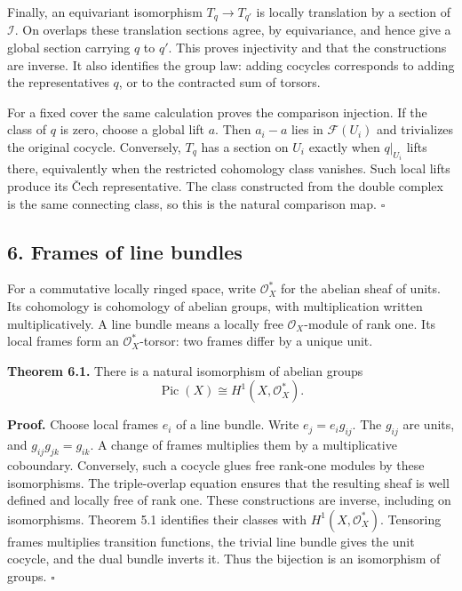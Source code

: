 \documentclass[11pt]{article}
\begin{document}
Finally, an equivariant isomorphism \(T_q\to T_{q'}\) is locally
translation by a section of \(\mathcal I\). On overlaps these
translation sections agree, by equivariance, and hence give a global
section carrying \(q\) to \(q'\). This proves injectivity and that the
constructions are inverse. It also identifies the group law: adding
cocycles corresponds to adding the representatives \(q\), or to the
contracted sum of torsors.

For a fixed cover the same calculation proves the comparison injection.
If the class of \(q\) is zero, choose a global lift \(a\). Then
\(a_i-a\) lies in \(\mathcal F(U_i)\) and trivializes the original
cocycle. Conversely, \(T_q\) has a section on \(U_i\) exactly when
\(q|_{U_i}\) lifts there, equivalently when the restricted cohomology
class vanishes. Such local lifts produce its Čech representative. The
class constructed from the double complex is the same connecting class,
so this is the natural comparison map. \(\square\)

\subsection{6. Frames of line bundles}\label{frames-of-line-bundles}

For a commutative locally ringed space, write \(\mathcal O_X^*\) for the
abelian sheaf of units. Its cohomology is cohomology of abelian groups,
with multiplication written multiplicatively. A line bundle means a
locally free \(\mathcal O_X\)-module of rank one. Its local frames form
an \(\mathcal O_X^*\)-torsor: two frames differ by a unique unit.

\textbf{Theorem 6.1.} There is a natural isomorphism of abelian groups
\[
\operatorname{Pic}(X)\cong H^1(X,\mathcal O_X^*).
\]

\textbf{Proof.} Choose local frames \(e_i\) of a line bundle. Write
\(e_j=e_i g_{ij}\). The \(g_{ij}\) are units, and
\(g_{ij}g_{jk}=g_{ik}\). A change of frames multiplies them by a
multiplicative coboundary. Conversely, such a cocycle glues free
rank-one modules by these isomorphisms. The triple-overlap equation
ensures that the resulting sheaf is well defined and locally free of
rank one. These constructions are inverse, including on isomorphisms.
Theorem 5.1 identifies their classes with \(H^1(X,\mathcal O_X^*)\).
Tensoring frames multiplies transition functions, the trivial line
bundle gives the unit cocycle, and the dual bundle inverts it. Thus the
bijection is an isomorphism of groups. \(\square\)
\end{document}
